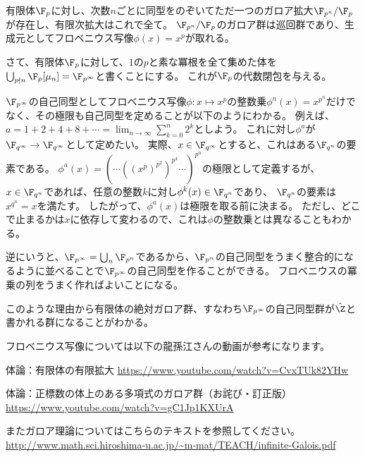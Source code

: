 \documentclass[uplatex]{jsarticle}
\begin{document}
\begin{prop}
  有限体$\F_p$に対し、次数$n$ごとに同型をのぞいてただ一つのガロア拡大$\F_{p^n}/\F_p$が存在し、有限次拡大はこれで全て。
  $\F_{p^n}/\F_p$のガロア群は巡回群であり、生成元としてフロベニウス写像$\phi(x)=x^p$が取れる。
\end{prop}

さて、有限体$\F_p$に対して、$1$の$p$と素な冪根を全て集めた体を$\bigcup_{p\nmid n}\F_p[\mu_n]=\F_{p^\infty}$と書くことにする。
これが$\F_p$の代数閉包を与える。

$\F_{p^\infty}$の自己同型としてフロベニウス写像$\phi:x\mapsto x^p$の整数乗$\phi^n(x)=x^{p^n}$だけでなく、その極限も自己同型を定めることが以下のようにわかる。
例えば、$a=1+2+4+8+\cdots=\lim_{n\to\infty}\sum_{k=0}^n2^k$としよう。
これに対し$\phi^a$が$\F_{q^\infty}\to\F_{q^\infty}$として定めたい。
実際、$x\in\F_{q^\infty}$とすると、これはある$\F_{q^n}$の要素である。
$\phi^a(x)=(\cdots((x^p)^{p^2})^{p^4}\cdots)^{p^n}$の極限として定義するが、
$x\in\F_{q^n}$であれば、任意の整数$k$に対し$\phi^k(x)\in\F_{q^n}$であり、
$\F_{q^n}$の要素は$x^{q^n}=x$を満たす。
したがって、$\phi^a(x)$は極限を取る前に決まる。
ただし、どこで止まるかは$x$に依存して変わるので、これは$\phi$の整数乗とは異なることもわかる。

逆にいうと、$\F_{p^\infty}=\bigcup_n\F_{p^n}$であるから、$\F_{p^n}$の自己同型をうまく整合的になるように並べることで$\F_{p^\infty}$の自己同型を作ることができる。
フロベニウスの冪乗の列をうまく作ればよいことになる。

このような理由から有限体の絶対ガロア群、すなわち$\F_{p^\infty}$の自己同型群が$\hat{\Z}$と書かれる群になることがわかる。

フロベニウス写像については以下の龍孫江さんの動画が参考になります。

体論：有限体の有限拡大
\url{https://www.youtube.com/watch?v=CvxTUk82YHw}

体論：正標数の体上のある多項式のガロア群（お詫び・訂正版）
\url{https://www.youtube.com/watch?v=gC1Jp1KXUrA}

またガロア理論についてはこちらのテキストを参照してください。
\url{http://www.math.sci.hiroshima-u.ac.jp/~m-mat/TEACH/infinite-Galois.pdf}
\end{document}
